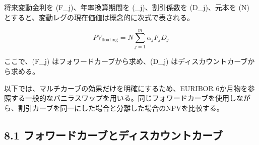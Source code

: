 \documentclass[
  letterpaper,
  DIV=11,
  numbers=noendperiod]{scrreprt}
\begin{document}
将来変動金利を (F\_j)、年率換算期間を (\alpha\_j)、割引係数を
(D\_j)、元本を (N)
とすると、変動レグの現在価値は概念的に次式で表される。

\[
PV_{\mathrm{floating}}
=
N
\sum_{j=1}^{m}
\alpha_j F_j D_j
\]

ここで、(F\_j) はフォワードカーブから求め、(D\_j)
はディスカウントカーブから求める。

以下では、マルチカーブの効果だけを明確にするため、EURIBOR
6か月物を参照する一般的なバニラスワップを用いる。同じフォワードカーブを使用しながら、割引カーブを同一にした場合と分離した場合のNPVを比較する。

\subsection{8.1
フォワードカーブとディスカウントカーブ}\label{ux30d5ux30a9ux30efux30fcux30c9ux30abux30fcux30d6ux3068ux30c7ux30a3ux30b9ux30abux30a6ux30f3ux30c8ux30abux30fcux30d6}
\end{document}
